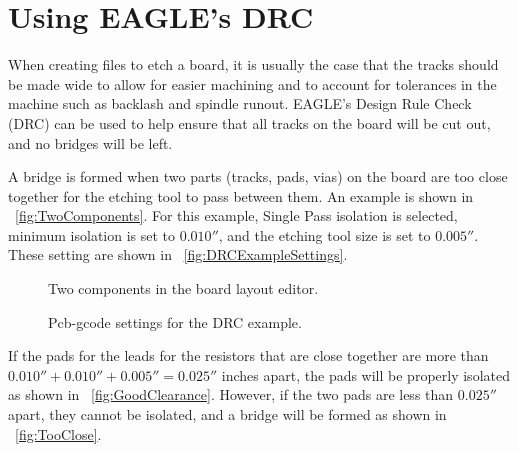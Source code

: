 \documentclass[11pt]{book}
\begin{document}
%
%
\section{Using EAGLE's DRC}\label{sec:EagleDRC}

When creating files to etch a board, it is usually the case that the tracks should be made wide to allow for easier machining and to account for tolerances in the machine such as backlash and spindle runout. EAGLE's Design Rule Check (DRC) can be used to help ensure that all tracks on the board will be cut out, and no bridges will be left. 

A bridge is formed when two parts (tracks, pads, vias) on the board are too close together for the etching tool to pass between them. An example is shown in \figurename~\vref{fig:TwoComponents}. For this example, Single Pass isolation is selected, minimum isolation is set to $0.010''$, and the etching tool size is set to $0.005''$. These setting are shown in \figurename~\vref{fig:DRCExampleSettings}.

\begin{figure}
	\caption{Two components in the board layout editor.}
	\label{fig:TwoComponents}
\end{figure}

\begin{figure}
	\caption{Pcb-gcode settings for the DRC example.}
	\label{fig:DRCExampleSettings}
\end{figure}

If the pads for the leads for the resistors that are close together are more than $0.010'' + 0.010'' + 0.005'' = 0.025''$ inches apart, the pads will be properly isolated as shown in \figurename~\vref{fig:GoodClearance}. However, if the two pads are less than $0.025''$ apart, they cannot be isolated, and a bridge will be formed as shown in \figurename~\vref{fig:TooClose}.
\end{document}
